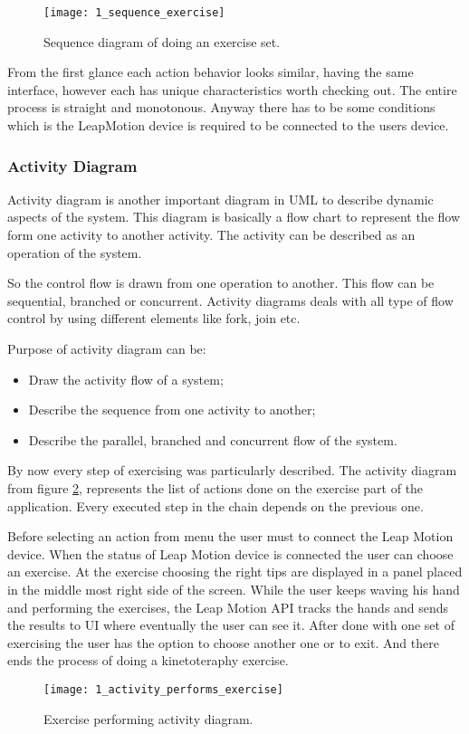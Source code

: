 \begin{figure}[!h]
\centering
\texttt{[image: 1\_sequence\_exercise]}
\caption{Sequence diagram of doing an exercise set.}\label{sequence_exercise}
\end{figure}
From the first glance each action behavior looks similar, having the same interface, however each has unique characteristics worth checking out. The entire process is straight and monotonous. Anyway there has to be some conditions which is the LeapMotion device is required to be connected to the users device.


\subsubsection{Activity Diagram}
Activity diagram is another important diagram in UML to describe dynamic aspects of the system. This diagram is basically a flow chart to represent the flow form one activity to another activity. The activity can be described as an operation of the system.

So the control flow is drawn from one operation to another. This flow can be sequential, branched or concurrent. Activity diagrams deals with all type of flow control by using different elements like fork, join etc.


Purpose of activity diagram can be:
\begin{itemize}
\item Draw the activity flow of a system;
\item Describe the sequence from one activity to another;
\item Describe the parallel, branched and concurrent flow of the system.
\end{itemize}
\vspace{0.2cm}

By now every step of exercising was particularly described.
The activity diagram from  \mbox{figure} \ref{activity_performs}, represents the list of actions done on the exercise part of the application. Every executed step in the chain  depends on the previous one.

Before selecting an action from menu the user must to connect the Leap Motion device. When the status of Leap Motion device is connected the user can choose an exercise. At the exercise choosing the right tips are displayed in a panel placed in the middle most right side of the screen. While the user keeps waving his hand and performing the exercises, the Leap Motion API tracks the hands and sends the results to UI where eventually the user can see it. After done with one set of exercising the user has the option to choose another one or to exit. And there ends the process of doing a kinetoteraphy exercise.
\begin{figure}[!h]
\centering
\texttt{[image: 1\_activity\_performs\_exercise]}
\caption{Exercise performing activity diagram.}\label{activity_performs}
\end{figure}


